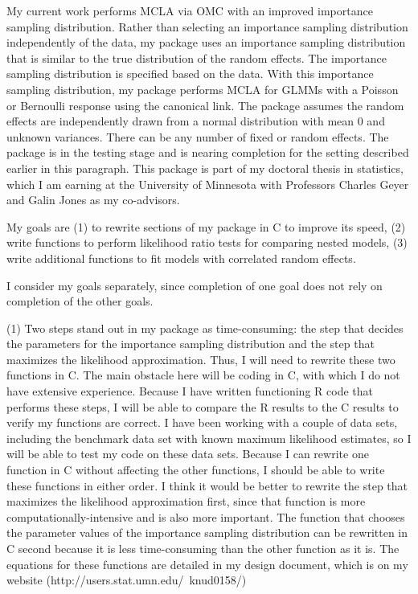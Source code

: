 \documentclass[12pt]{article}
\begin{document}
My current work performs MCLA via OMC with an improved importance sampling distribution.  Rather than selecting an importance sampling distribution independently of the data, my  package uses an importance sampling distribution that is similar to the true distribution of the random effects.  The importance sampling distribution is specified based on the data.  With this importance sampling distribution, my package performs MCLA for GLMMs with a Poisson or Bernoulli response using the canonical link.  The package assumes the random effects are independently drawn from a normal distribution with mean 0 and unknown variances. There can be any number of fixed or random effects.  The package is in the testing stage and is nearing completion for the setting described earlier in this paragraph.  This package is part of my doctoral thesis in statistics, which I am earning at the University of Minnesota with Professors Charles Geyer and Galin Jones as my co-advisors.




My goals are  (1) to rewrite sections of my package in C to  improve its speed, (2) write functions to perform likelihood ratio tests for comparing nested models, (3) write additional functions to fit models with correlated random effects.  




I consider my  goals separately, since completion of one goal does not rely on completion of the other goals.

(1) Two steps stand out in my package as time-consuming: the step that decides the parameters for the importance sampling distribution and the step that maximizes the likelihood approximation. Thus, I will need to rewrite these two functions in C.  The main obstacle here will be coding in C, with which I do not have extensive experience.  Because I have written functioning R code that performs these steps, I will be able to compare the R results to the C results to verify my functions are correct. I have been working with a couple of data sets, including the benchmark \citet{booth:hobert:1999} data set with known maximum likelihood estimates, so I will be able to test my code on these data sets. Because I can rewrite one function in C without affecting the other functions, I should be able to write these functions in either order.  I think it would be better to rewrite the step that maximizes the likelihood approximation first, since  that function is more computationally-intensive and is also more important.  The function that chooses the parameter values of the importance sampling distribution can be rewritten in C second because it is less time-consuming than the other function as it is. The equations for these functions are detailed in my design document, which is on my website (http://users.stat.umn.edu/~knud0158/) 
\end{document}
